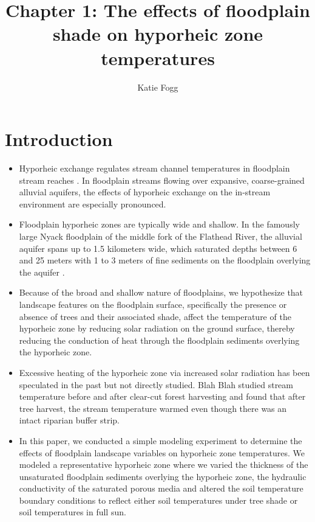 \documentclass[letterpaper, 11pt]{article}
\title{Chapter 1: The effects of floodplain shade on hyporheic zone temperatures}
\author{Katie Fogg}
\date{}
\begin{document}
\maketitle

\section{Introduction}
\begin{itemize}
    \item Hyporheic exchange regulates stream channel temperatures in floodplain stream reaches \parencite{Arrigoni2008BufferedChannels}. In floodplain streams flowing over expansive, coarse-grained alluvial aquifers, the effects of hyporheic exchange on the in-stream environment are especially pronounced.
    
    \item Floodplain hyporheic zones are typically wide and shallow. In the famously large Nyack floodplain of the middle fork of the Flathead River, the alluvial aquifer spans up to 1.5 kilometers wide, which saturated depths between 6 and 25 meters with 1 to 3 meters of fine sediments on the floodplain overlying the aquifer \parencite{Helton2014RelativeFloodplain}. 

    \item Because of the broad and shallow nature of floodplains, we hypothesize that landscape features on the floodplain surface, specifically the presence or absence of trees and their associated shade, affect the temperature of the hyporheic zone by reducing solar radiation on the ground surface, thereby reducing the conduction of heat through the floodplain sediments overlying the hyporheic zone. 
    
    \item Excessive heating of the hyporheic zone via increased solar radiation has been speculated in the past but not directly studied. Blah Blah studied stream temperature before and after clear-cut forest harvesting and found that after tree harvest, the stream  temperature warmed even though there was an intact riparian buffer strip. 
    
    \item In this paper, we conducted a simple modeling experiment to determine the effects of floodplain landscape variables on hyporheic zone temperatures. We modeled a representative hyporheic zone where we varied the thickness of the unsaturated floodplain sediments overlying the hyporheic zone, the hydraulic conductivity of the saturated porous media and altered the soil temperature boundary conditions to reflect either soil temperatures under tree shade or soil temperatures in full sun. 

\end{itemize}
\end{document}
